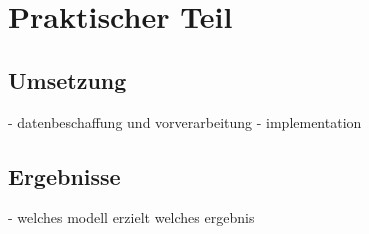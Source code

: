 \chapter{Praktischer Teil}

\section{Umsetzung}
- datenbeschaffung und vorverarbeitung
- implementation

\section{Ergebnisse}
- welches modell erzielt welches ergebnis
